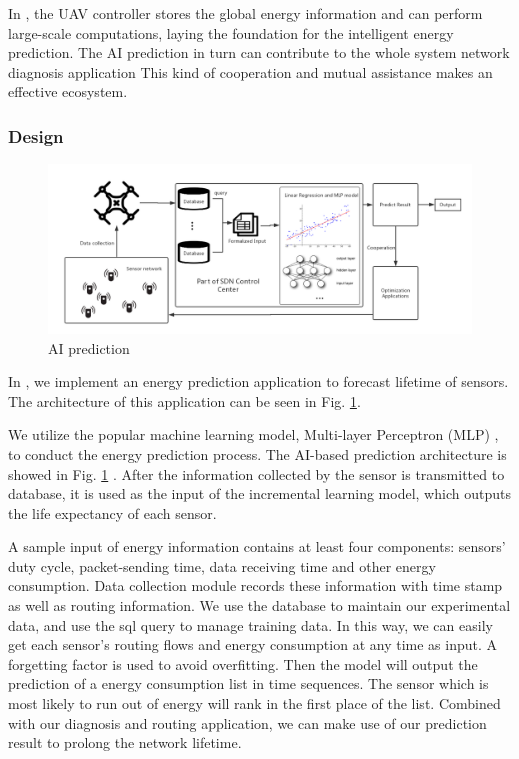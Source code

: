 In {\sdn}, the UAV controller stores the global energy information 
and can perform large-scale computations, laying 
the foundation for the intelligent energy prediction.
The AI prediction in turn can contribute to the whole system  network diagnosis application
This kind of cooperation and mutual assistance makes {\sdn} an effective ecosystem.



\subsubsection{Design}

\begin{figure}[htbp]
	\centering
	\includegraphics[width=6.5in]{Figure/SDWN-AIprediction}
	\caption{AI prediction}
	\label{prediction}
\end{figure}

In {\sdn},  we implement an energy prediction application 
to forecast lifetime of sensors. The architecture of this application
can be seen in Fig. \ref{prediction}.


We utilize the popular machine learning model, 
Multi-layer Perceptron (MLP) \cite{Harvey1988An},
to conduct the energy prediction process. 
The AI-based prediction architecture is  showed in Fig. \ref{prediction} .
After the information collected by the sensor is transmitted to database, it is used as
the input of the incremental learning model, which outputs the
life expectancy of each sensor. 

A sample input of energy information contains at least four components: sensors'
duty cycle, packet-sending time, data receiving time and other energy
consumption. Data collection module records these information with time stamp
as well as routing information. We use the database to maintain our experimental data,
and use the sql query to manage training data. In this way, we can easily
get each sensor's routing flows and energy consumption at any time as input. A forgetting factor
is used to avoid overfitting. Then the model will output the prediction of a energy consumption list in time
sequences. The sensor which is most likely to run out of energy will rank in the first place of the list. 
Combined with our diagnosis and routing application, we can make use of our prediction result to prolong the network
lifetime.





